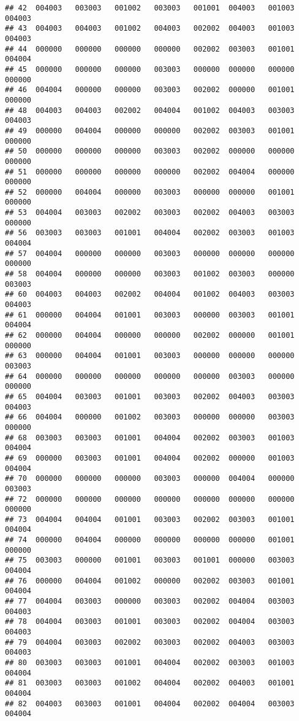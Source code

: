 \documentclass[
]{article}
\begin{document}
\begin{verbatim}
## 42  004003   003003   001002   003003   001001  004003   001003   004003
## 43  004003   004003   001002   004003   002002  004003   001003   004003
## 44  000000   000000   000000   000000   002002  003003   001001   004004
## 45  000000   000000   000000   003003   000000  000000   000000   000000
## 46  004004   000000   000000   003003   002002  000000   001001   000000
## 48  004003   004003   002002   004004   001002  004003   003003   004003
## 49  000000   004004   000000   000000   002002  003003   001001   000000
## 50  000000   000000   000000   003003   002002  000000   000000   000000
## 51  000000   000000   000000   000000   002002  004004   000000   000000
## 52  000000   004004   000000   003003   000000  000000   001001   000000
## 53  004004   003003   002002   003003   002002  004003   003003   000000
## 56  003003   003003   001001   004004   002002  003003   001003   004004
## 57  004004   000000   000000   003003   000000  000000   000000   000000
## 58  004004   000000   000000   003003   001002  003003   000000   003003
## 60  004003   004003   002002   004004   001002  004003   003003   004003
## 61  000000   004004   001001   003003   000000  003003   001001   004004
## 62  000000   004004   000000   000000   002002  000000   001001   000000
## 63  000000   004004   001001   003003   000000  000000   000000   003003
## 64  000000   000000   000000   000000   000000  003003   000000   000000
## 65  004004   003003   001001   003003   002002  004003   003003   004003
## 66  004004   000000   001002   003003   000000  000000   003003   000000
## 68  003003   003003   001001   004004   002002  003003   001003   004004
## 69  000000   003003   001001   004004   002002  000000   001003   004004
## 70  000000   000000   000000   003003   000000  004004   000000   003003
## 72  000000   000000   000000   000000   000000  000000   000000   000000
## 73  004004   004004   001001   003003   002002  003003   001001   004004
## 74  000000   004004   000000   000000   000000  000000   001001   000000
## 75  003003   000000   001001   003003   001001  000000   003003   004004
## 76  000000   004004   001002   000000   002002  003003   001001   004004
## 77  004004   003003   000000   003003   002002  004004   003003   004003
## 78  004004   003003   001001   003003   002002  004004   003003   004003
## 79  004004   003003   002002   003003   002002  004003   003003   004003
## 80  003003   003003   001001   004004   002002  003003   001003   004004
## 81  003003   003003   001002   004004   002002  004003   001001   004004
## 82  004003   003003   001001   004004   002002  004004   003003   004004

\end{verbatim}
\end{document}
